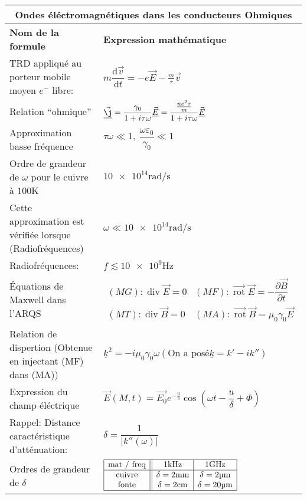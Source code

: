 \documentclass[10pt,a4paper,titlepage,portrait]{article}
\renewcommand{\d}
{
    \mathrm{d}
}
\newcommand*{\dv}[2]
{
    \dfrac{\d#1}{\d#2}
}
\newcommand*{\dpv}[2]
{
    \dfrac{\partial#1}{\partial#2}
}
\newcommand{\rot}
{
    \vec{\operatorname{rot}}
}
\renewcommand{\div}
{
    \operatorname{div}
}
\renewcommand{\arraystretch}{2}
\begin{document}
\begin{center}
\begin{table}[ht]
    \centering
    \renewcommand{\arraystretch}{1.5} %
    \setlength{\tabcolsep}{8pt} %
    \begin{tabular}{@{}p{9cm}p{10cm}@{}}
        \toprule
        \multicolumn{2}{c}{\textbf{Ondes éléctromagnétiques dans les conducteurs Ohmiques}} \\
        \midrule
        \textbf{Nom de la formule} & \textbf{Expression mathématique} \\
        \midrule
        TRD appliqué au porteur mobile moyen $e^-$ libre: & $m\dv{\vec{v}}{t} = -e\vec{E} - \frac{m}{\tau}\vec{v}$ \\
        Relation ``ohmique'' & $\vec{\underline{\j}} =\dfrac{\gamma_0}{1+i\tau\omega}\vec{\underline{E}} = \dfrac{\frac{ne^2\tau}{m}}{1+i\tau\omega}\vec{\underline{E}}$ \\
        Approximation basse fréquence & $\tau\omega \ll 1, \ \dfrac{\omega\varepsilon_0}{\gamma_0}\ll1$ \\ 
        Ordre de grandeur de $\omega$ pour le cuivre à $\num{100} \unit{\kelvin}$ & $\num{10e14} \unit{\radian\per\second}$ \\
        Cette approximation est vérifiée lorsque (Radiofréquences) & $\omega \ll \num{10e14}\unit{\radian\per\second}$ \\
        Radiofréquences: & $f \lesssim \num{10e9}\unit{\Hz}$ \\
        Équations de Maxwell dans l'ARQS & $\begin{matrix}(MG): \div \vec{E} = 0 & (MF): \rot\vec{E} = -\dpv{\vec{B}}{t} \\ (MT): \div \vec{B} = 0 & (MA): \rot \vec{B} = \mu_0\gamma_0\vec{E}\end{matrix}$ \\
        Relation de dispertion (Obtenue en injectant (MF) dans (MA))& $\underline{k}^2 = -i\mu_0\gamma_0\omega (\text{On a posé} \underline{k} = k'-ik'')$ \\
        Expression du champ éléctrique & $\vec{E}(M,t )=\vec{E_0}e^{-\frac{u}{\delta}}\cos\left(\omega t - \dfrac{u}{\delta} + \Phi\right)$ \\
        Rappel: Distance caractéristique d'atténuation: & $\delta = \dfrac{1}{|k''(\omega)|}$ \\ 
        Ordres de grandeur de $\delta$ & $\begin{array}{|c||c|c|} \hline \text{mat / freq} & \num{1}\unit{\kHz} & \num{1}\unit{\GHz} \\ \hline \text{cuivre} & \delta = \num{2}\unit{\mm} & \delta = \num{2}\unit{\micro\meter} \\ \text{fonte} & \delta =  \num{2}\unit{\cm} & \delta = \num{20}\unit{\micro\meter} \\ \hline \end{array}$ \\ 

\end{tabular}
\end{table}
\end{center}
\end{document}
